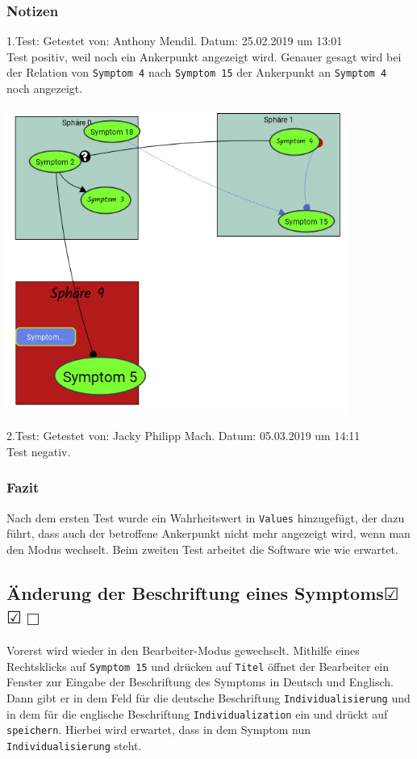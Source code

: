 \documentclass[enabledeprecatedfontcommands]{scrartcl}
\newcommand{\subsectiont}[2]{\subsection[#1]{#1{\normalsize\normalfont #2}}}
\newcommand{\leer}{$\Box$}
\newcommand{\ok}{$\CheckedBox$}
\begin{document}
\subsubsection{Notizen}
1.Test: Getestet von: Anthony Mendil. Datum: 25.02.2019 um 13:01 \\
Test positiv, weil noch ein Ankerpunkt angezeigt wird. Genauer gesagt wird bei der Relation von \texttt{Symptom 4} nach \texttt{Symptom 15} der Ankerpunkt an \texttt{Symptom 4} noch angezeigt. \\
\begin{center}
\includegraphics[height=10cm]{3_43.PNG}
\end{center}
2.Test: Getestet von: Jacky Philipp Mach. Datum: 05.03.2019 um 14:11 \\
Test negativ. 

\subsubsection{Fazit}
Nach dem ersten Test wurde ein Wahrheitswert in \texttt{Values} hinzugefügt, der dazu führt, dass auch der betroffene Ankerpunkt nicht mehr angezeigt wird, wenn man den Modus wechselt. Beim zweiten Test arbeitet die Software wie wie erwartet.

\subsectiont{Änderung der Beschriftung eines Symptoms}{\dotfill\ok\ok\leer}
Vorerst wird wieder in den Bearbeiter-Modus gewechselt. Mithilfe eines Rechtsklicks auf \texttt{Symptom 15} und drücken auf \texttt{Titel} öffnet der Bearbeiter ein Fenster zur Eingabe der Beschriftung des Symptoms in Deutsch und Englisch. Dann gibt er in dem Feld für die deutsche Beschriftung \texttt{Individualisierung}  und in dem für die englische Beschriftung \texttt{Individualization} ein und drückt auf \texttt{speichern}. Hierbei wird erwartet, dass in dem Symptom nun \texttt{Individualisierung} steht. 
\end{document}
